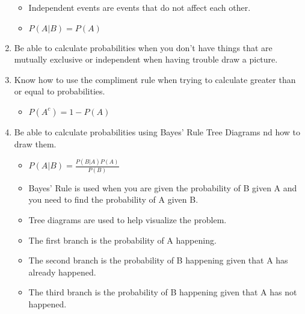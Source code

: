 \documentclass{article}
\begin{document}
\begin{enumerate}
\begin{itemize}
         \item Independent events are events that do not affect each other.
         \item $P(A|B) = P(A)$
    \end{itemize}
    \item Be able to calculate probabilities when you don't have things that are mutually exclusive or independent 
    when having trouble draw a picture. 
    \item Know how to use the compliment rule when trying to calculate greater than or equal to probabilities.
    \begin{itemize}
        \item $P(A^c) = 1 - P(A)$
    \end{itemize}
    \item Be able to calculate probabilities using Bayes' Rule Tree Diagrams nd how to draw them. 
    \begin{itemize}
        \item $P(A|B) = \frac{P(B|A)P(A)}{P(B)}$
        \item Bayes' Rule is used when you are given the probability of B given A and you need to find the probability of A given B.
        \item Tree diagrams are used to help visualize the problem.
        \item The first branch is the probability of A happening.
        \item The second branch is the probability of B happening given that A has already happened.
        \item The third branch is the probability of B happening given that A has not happened.
    \end{itemize}
\end{enumerate}
\end{document}
